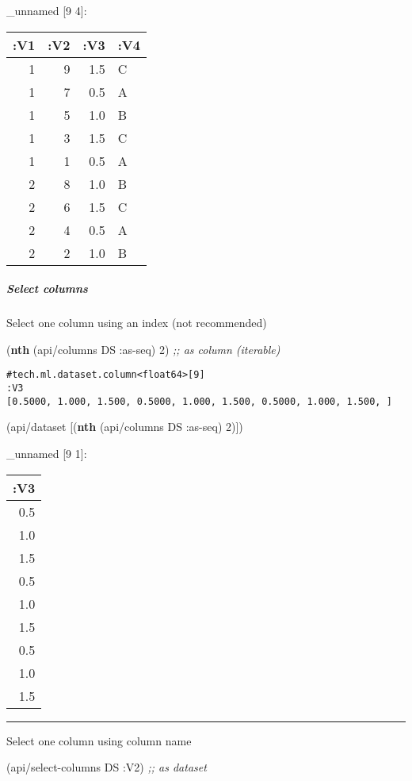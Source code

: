 \documentclass[]{article}
\newenvironment{Shaded}{\begin{snugshade}}{\end{snugshade}}
\newcommand{\KeywordTok}[1]{\textcolor[rgb]{0.13,0.29,0.53}{\textbf{#1}}}
\newcommand{\DecValTok}[1]{\textcolor[rgb]{0.00,0.00,0.81}{#1}}
\newcommand{\CommentTok}[1]{\textcolor[rgb]{0.56,0.35,0.01}{\textit{#1}}}
\newcommand{\AttributeTok}[1]{\textcolor[rgb]{0.77,0.63,0.00}{#1}}
\newcommand{\NormalTok}[1]{#1}
\let\oldsubparagraph\subparagraph
\renewcommand{\subparagraph}[1]{\oldsubparagraph{#1}\mbox{}}
\begin{document}
\_unnamed {[}9 4{]}:

\begin{longtable}[]{@{}rrrl@{}}
\toprule
:V1 & :V2 & :V3 & :V4\tabularnewline
\midrule
\endhead
1 & 9 & 1.5 & C\tabularnewline
1 & 7 & 0.5 & A\tabularnewline
1 & 5 & 1.0 & B\tabularnewline
1 & 3 & 1.5 & C\tabularnewline
1 & 1 & 0.5 & A\tabularnewline
2 & 8 & 1.0 & B\tabularnewline
2 & 6 & 1.5 & C\tabularnewline
2 & 4 & 0.5 & A\tabularnewline
2 & 2 & 1.0 & B\tabularnewline
\bottomrule
\end{longtable}

\subparagraph{Select columns}\label{select-columns}

Select one column using an index (not recommended)

\begin{Shaded}
\begin{Highlighting}[]
\NormalTok{(}\KeywordTok{nth}\NormalTok{ (api/columns DS }\AttributeTok{:as-seq}\NormalTok{) }\DecValTok{2}\NormalTok{) }\CommentTok{;; as column (iterable)}
\end{Highlighting}
\end{Shaded}

\begin{verbatim}
#tech.ml.dataset.column<float64>[9]
:V3
[0.5000, 1.000, 1.500, 0.5000, 1.000, 1.500, 0.5000, 1.000, 1.500, ]
\end{verbatim}

\begin{Shaded}
\begin{Highlighting}[]
\NormalTok{(api/dataset [(}\KeywordTok{nth}\NormalTok{ (api/columns DS }\AttributeTok{:as-seq}\NormalTok{) }\DecValTok{2}\NormalTok{)])}
\end{Highlighting}
\end{Shaded}

\_unnamed {[}9 1{]}:

\begin{longtable}[]{@{}r@{}}
\toprule
:V3\tabularnewline
\midrule
\endhead
0.5\tabularnewline
1.0\tabularnewline
1.5\tabularnewline
0.5\tabularnewline
1.0\tabularnewline
1.5\tabularnewline
0.5\tabularnewline
1.0\tabularnewline
1.5\tabularnewline
\bottomrule
\end{longtable}

\begin{center}\rule{0.5\linewidth}{0.5pt}\end{center}

Select one column using column name

\begin{Shaded}
\begin{Highlighting}[]
\NormalTok{(api/select-columns DS }\AttributeTok{:V2}\NormalTok{) }\CommentTok{;; as dataset}
\end{Highlighting}
\end{Shaded}
\end{document}
